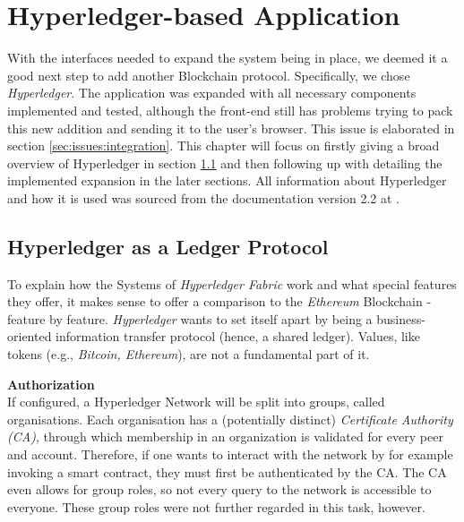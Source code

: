 %
\section{Hyperledger-based Application}
\label{sec:impr:hl}



With the interfaces needed to expand the system being in place, we deemed it a good next step to add another Blockchain protocol. Specifically, we chose \emph{Hyperledger}. The application was expanded with all necessary components implemented and tested, although the front-end still has problems trying to pack this new addition and sending it to the user's browser. This issue is elaborated in section \ref{sec:issues:integration}. This chapter will focus on firstly giving a broad overview of Hyperledger in section \ref{sec:impr:hl:basics} and then following up with detailing the implemented expansion in the later sections. \newline
All information about Hyperledger and how it is used was sourced from the documentation version 2.2 at \cite{hyperledger}.

\subsection{Hyperledger as a Ledger Protocol}
\label{sec:impr:hl:basics}

To explain how the Systems of \emph{Hyperledger Fabric} work and what special features they offer, it makes sense to offer a comparison to the \emph{Ethereum} Blockchain - feature by feature. \emph{Hyperledger} wants to set itself apart by being a business-oriented information transfer protocol (hence, a shared ledger). Values, like tokens (e.g., \emph{Bitcoin, Ethereum}), are not a fundamental part of it.

\textbf{Authorization} \\[0.2em]
If configured, a Hyperledger Network will be split into groups, called organisations. Each organisation has a (potentially distinct) \emph{Certificate Authority (CA)}, through which membership in an organization is validated for every peer and account. Therefore, if one wants to interact with the network by for example invoking a smart contract, they must first be authenticated  by the CA. The CA even allows for group roles, so not every query to the network is accessible to everyone. These group roles were not further regarded in this task, however.

